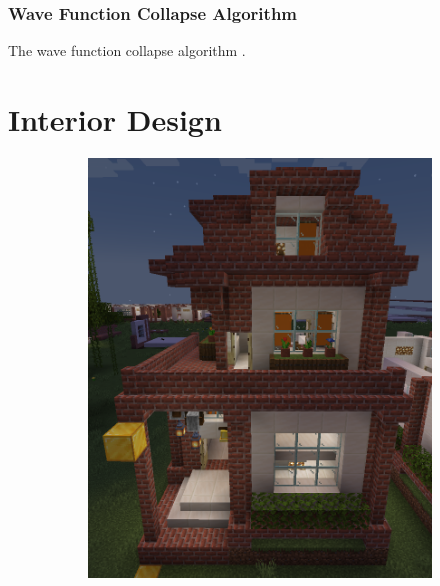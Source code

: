 \documentclass[
oneside,
fontsize=11pt
]{scrartcl}
\begin{document}
\subsubsection{Wave Function Collapse Algorithm}
The wave function collapse algorithm \cite{WFC_GitHub, WFC_YouTube}.




\section{Interior Design}

\begin{figure}[ht]
  \centering
  \begin{subfigure}[t]{0.3\textwidth}
    \includegraphics[width=\textwidth]{images/interior/entrance-decoration.png}
  \end{subfigure}
  \hfill
  \begin{subfigure}[t]{0.3\textwidth}

\end{subfigure}
\end{figure}
\end{document}
